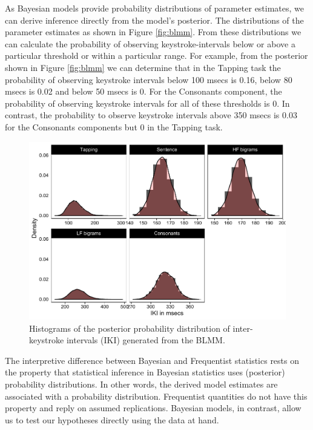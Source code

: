 \documentclass[,man,floatsintext]{apa6}
\begin{document}
\begin{appendix}
As Bayesian models provide probability distributions of parameter
estimates, we can derive inference directly from the model's posterior.
The distributions of the parameter estimates as shown in Figure
\ref{fig:blmm}. From these distributions we can calculate the
probability of observing keystroke-intervals below or above a particular
threshold or within a particular range. For example, from the posterior
shown in Figure \ref{fig:blmm} we can determine that in the Tapping task
the probability of observing keystroke intervals below 100 msecs is
0.16, below 80 msecs is 0.02 and below 50 msecs is 0. For the Consonants
component, the probability of observing keystroke intervals for all of
these thresholds is 0. In contrast, the probability to observe keystroke
intervals above 350 msecs is 0.03 for the Consonants components but 0 in
the Tapping task.

\begin{figure}[!h]

{\centering \includegraphics{ct_files/figure-latex/fig1-1} 

}

\caption{\label{fig:blmm}Histograms of the posterior probability distribution of inter-keystroke intervals (IKI) generated from the BLMM.}\label{fig:fig1}
\end{figure}

The interpretive difference between Bayesian and Frequentist statistics
rests on the property that statistical inference in Bayesian statistics
uses (posterior) probability distributions. In other words, the derived
model estimates are associated with a probability distribution.
Frequentist quantities do not have this property and reply on assumed
replications. Bayesian models, in contrast, allow us to test our
hypotheses directly using the data at hand.


\end{appendix}
\end{document}
